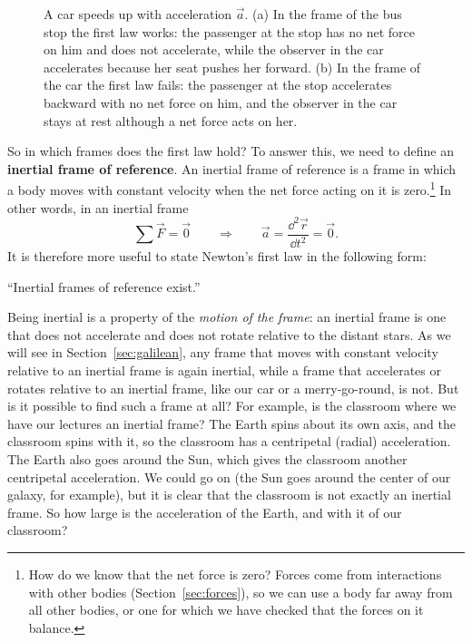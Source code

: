 \documentclass[11pt,a4paper]{article}
\begin{document}
\begin{figure}[ht]
\caption{A car speeds up with acceleration $\vec{a}$. (a) In the frame of the bus stop the first
law works: the passenger at the stop has no net force on him and does not accelerate, while the
observer in the car accelerates because her seat pushes her forward. (b) In the frame of the car the
first law fails: the passenger at the stop accelerates backward with no net force on him, and the
observer in the car stays at rest although a net force acts on her.}\label{fig:car}
\end{figure}

So in which frames does the first law hold? To answer this, we need to define an \textbf{inertial
frame of reference}. An inertial frame of reference is a frame in which a body moves with constant
velocity when the net force acting on it is zero.\footnote{How do we know that the net force is
zero? Forces come from interactions with other bodies (Section~\ref{sec:forces}), so we can use a
body far away from all other bodies, or one for which we have checked that the forces on it
balance.} In other words, in an inertial frame
\begin{equation}\label{eq:inertial}
  \sum \vec{F} = \vec{0} \qquad \Longrightarrow \qquad \vec{a} = \frac{\dd^2\vec{r}}{\dd t^2} = \vec{0} .
\end{equation}
It is therefore more useful to state Newton's first law in the following form:
\begin{center}
``Inertial frames of reference exist.''
\end{center}

Being inertial is a property of the \emph{motion of the frame}: an inertial frame is one that does
not accelerate and does not rotate relative to the distant stars. As we will see in Section~\ref{sec:galilean}, any frame that
moves with constant velocity relative to an inertial frame is again inertial, while a frame that
accelerates or rotates relative to an inertial frame, like our car or a merry-go-round, is not.
But is it possible to find such a frame at all? For example, is the classroom where we have our
lectures an inertial frame? The Earth spins about its own axis, and the classroom spins with it, so
the classroom has a centripetal (radial) acceleration. The Earth also goes around the Sun, which
gives the classroom another centripetal acceleration. We could go on (the Sun goes around the center
of our galaxy, for example), but it is clear that the classroom is not exactly an inertial frame.
So how large is the acceleration of the Earth, and with it of our classroom?
\end{document}
